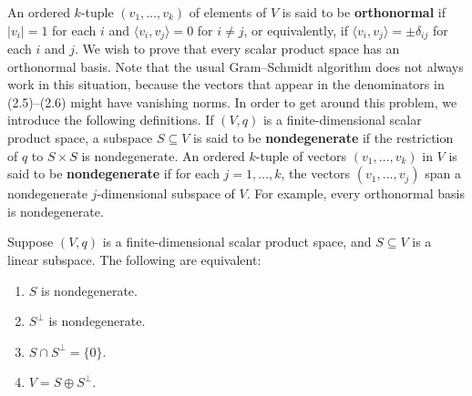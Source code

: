 An ordered $k$-tuple $(v_1,\ldots,v_k)$ of elements of $V$ is said to be \textbf{orthonormal} if $|v_i| = 1$ for each $i$ and $\langle v_i, v_j \rangle = 0$ for $i \neq j$, or equivalently, if $\langle v_i, v_j \rangle = \pm\delta_{ij}$ for each $i$ and $j$. We wish to prove that every scalar product space has an orthonormal basis. Note that the usual Gram--Schmidt algorithm does not always work in this situation, because the vectors that appear in the denominators in (2.5)--(2.6) might have vanishing norms. In order to get around this problem, we introduce the following definitions. If $(V,q)$ is a finite-dimensional scalar product space, a subspace $S \subseteq V$ is said to be \textbf{nondegenerate} if the restriction of $q$ to $S \times S$ is nondegenerate. An ordered $k$-tuple of vectors $(v_1,\ldots,v_k)$ in $V$ is said to be \textbf{nondegenerate} if for each $j = 1,\ldots,k$, the vectors $(v_1,\ldots,v_j)$ span a nondegenerate $j$-dimensional subspace of $V$. For example, every orthonormal basis is nondegenerate.

\begin{lemma}\label{lem:nondegenerate-subspace}
\leanok
{}
Suppose $(V,q)$ is a finite-dimensional scalar product space, and $S \subseteq V$ is a linear subspace. The following are equivalent:
\begin{enumerate}[label=(\alph*)]
\item $S$ is nondegenerate.
\item $S^\perp$ is nondegenerate.
\item $S \cap S^\perp = \{0\}$.
\item $V = S \oplus S^\perp$.
\end{enumerate}
\end{lemma}

